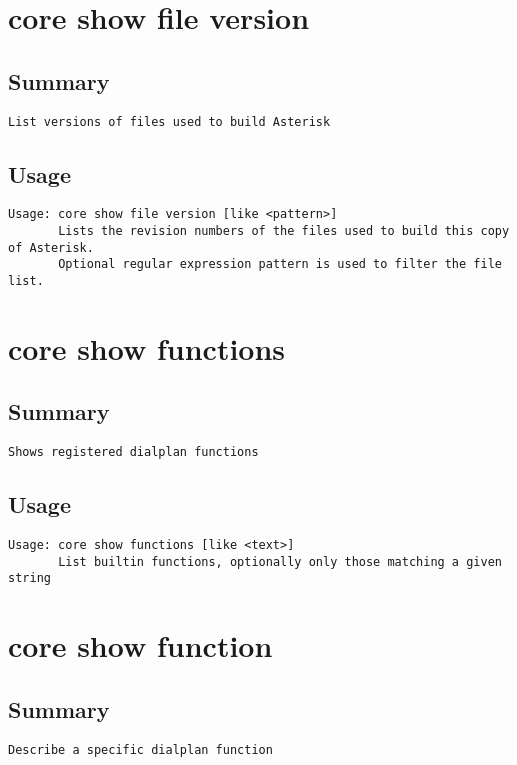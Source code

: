 \section{core show file version}
\subsection{Summary}
\begin{verbatim}
List versions of files used to build Asterisk
\end{verbatim}
\subsection{Usage}
\begin{verbatim}
Usage: core show file version [like <pattern>]
       Lists the revision numbers of the files used to build this copy of Asterisk.
       Optional regular expression pattern is used to filter the file list.

\end{verbatim}


\section{core show functions}
\subsection{Summary}
\begin{verbatim}
Shows registered dialplan functions
\end{verbatim}
\subsection{Usage}
\begin{verbatim}
Usage: core show functions [like <text>]
       List builtin functions, optionally only those matching a given string

\end{verbatim}


\section{core show function}
\subsection{Summary}
\begin{verbatim}
Describe a specific dialplan function
\end{verbatim}
